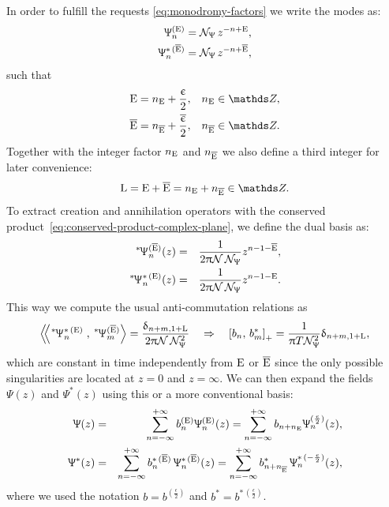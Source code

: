 In order to fulfill the requests \eqref{eq:monodromy-factors} we write the
modes as:
\begin{equation}
  \begin{split}
    \Uppsi_n^{( \mathrm{E} )} & = \mathcal{N}_{\Uppsi}\, z^{-n + \mathrm{E}},
    \\
    \Uppsi_n^{*\, ( \overline{\mathrm{E}} )} & = \mathcal{N}_{\Uppsi}\, z^{-n + \overline{\mathrm{E}}},
  \end{split}
  \label{eq:usual-twisted-modes}
\end{equation}
such that
\begin{equation}
  \begin{split}
    \rE = n_{\rE} + \frac{\epsilon}{2},
    & \quad
    n_{\rE} \in \Z,
    \\
    \brE = n_{\brE} + \frac{\bepsilon}{2},
    & \quad
    n_{\brE} \in \Z.
  \end{split}
\end{equation}
Together with the integer factor $n_{\mathrm{E}}$ and $n_{\overline{\mathrm{E}}}$ we also define a third integer for later convenience:\footnotemark
{}
\begin{equation}
  \rL = \rE + \brE = n_{\rE} + n_{\brE} \in \Z.
  \label{eq:usual_integer_factor}
\end{equation}
To extract creation and annihilation operators with the conserved product~\eqref{eq:conserved-product-complex-plane}, we define the dual basis as:
\begin{eqnarray}
  \dual{\Psi}_n^{( \brE )}( z )
  & = &
  \frac{1}{2 \pi \cN\, \cN_{\Psi}} z^{n - 1 - \brE},
  \\
  \dual{\Psi}_n^{*\, ( \rE )}( z )
  & = &
  \frac{1}{2 \pi \cN\, \cN_{\Psi}} z^{n - 1 - \rE}.
\end{eqnarray}
This way we compute the usual anti-commutation relations as
\begin{equation}
  \lconsprod{\dual{\Psi}_n^{*\, ( \rE )}}{\dual{\Psi}_m^{( \brE )}}
  =
  \frac{\delta_{n + m, 1 + \rL}}{2 \pi \cN\, \cN_{\Psi}^2}
  \quad \Rightarrow \quad
  \liebraket{b_n}{b_m^*}_+
  =
  \frac{1}{\pi T \cN_{\Psi}^2} \delta_{n + m, 1 + \rL},
  \label{eq:twisted-fermion-algebra}
\end{equation}
which are constant in time independently from $\mathrm{E}$ or $\overline{\mathrm{E}}$ since the only possible singularities are located at $z = 0$ and $z = \infty$.
We can then expand the fields $\Psi(z)$ and $\Psi^*( z )$ using this or a more conventional basis:
\begin{eqnarray}
  \Uppsi( z )
  & = &
  \sum\limits_{n = -\infty}^{+\infty} b^{(\mathrm{E})}_n \Uppsi_n^{( \mathrm{E} )}( z )
  =
  \sum\limits_{n = -\infty}^{+\infty} b_{n + n_{\mathrm{E}}} \Uppsi_n^{( \frac{\upepsilon}{2} )}( z ),
  \label{eq:usual-twisted-mode-expansion}
  \\
  \Uppsi^*( z )
  & = &
  \sum\limits_{n = -\infty}^{+\infty} b^{*\, (\overline{\mathrm{E}})}_n\, \Uppsi_n^{*\, (\overline{\mathrm{E}})}(z)
  =
  \sum\limits_{n = -\infty}^{+\infty} b^{*}_{n+n_{\overline{\mathrm{E}}}}\, \Uppsi_n^{*\, (-\frac{\upepsilon}{2})}(z),
  \label{eq:usual-twisted-mode-expansion-conjugate}
\end{eqnarray}
where we used the notation $b = b^{( \frac{\epsilon}{2} )}$ and $b^* = b^{*\,( \frac{\epsilon}{2} )}$.


